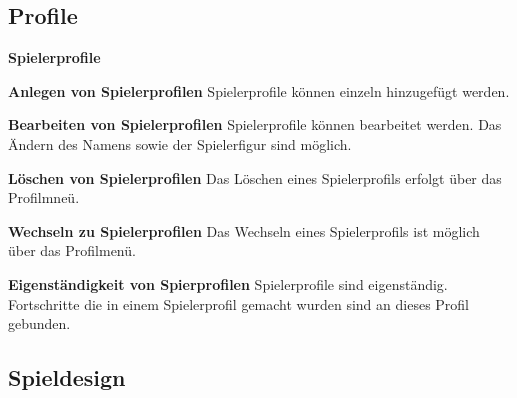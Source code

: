\documentclass{scrartcl}
\begin{document}
\subsection{Profile}
\begin{falist}[resume]
	\item \label{fa:spielerprofile} \textbf{Spielerprofile}
	\begin{falist}
		\item \label{fa:spielerprofile_anlegen} \textbf{Anlegen von Spielerprofilen} Spielerprofile können einzeln hinzugefügt werden.
		\item \label{fa:spielerprofile_bearbeiten} \textbf{Bearbeiten von Spielerprofilen} Spielerprofile können bearbeitet werden. Das Ändern des Namens sowie der Spielerfigur sind möglich.
		\item \label{fa:spielerprofile_loeschen} \textbf{Löschen von Spielerprofilen} Das Löschen eines Spielerprofils erfolgt über das Profilmneü.
		\item \label{fa:spielerprofile_wechseln} \textbf{Wechseln zu Spielerprofilen} Das Wechseln eines Spielerprofils ist möglich über das Profilmenü.
		\item \label{fa:spielerprofile_separiert} \textbf{Eigenständigkeit von Spierprofilen} Spielerprofile sind eigenständig. Fortschritte die in einem Spielerprofil gemacht wurden sind an dieses Profil gebunden.
	\end{falist}
\end{falist}

\subsection{Spieldesign}
\end{document}
